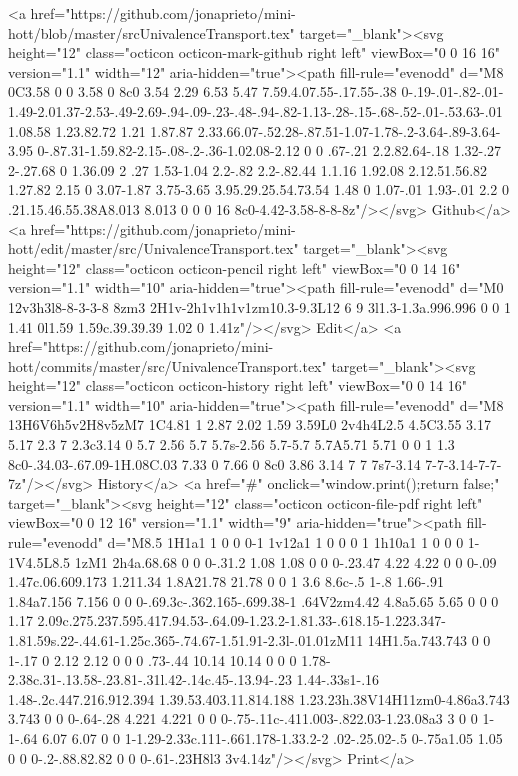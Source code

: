       <a href="https://github.com/jonaprieto/mini-hott/blob/master/srcUnivalenceTransport.tex" target="_blank"><svg height="12" class="octicon octicon-mark-github right left" viewBox="0 0 16 16" version="1.1" width="12" aria-hidden="true"><path fill-rule="evenodd" d="M8 0C3.58 0 0 3.58 0 8c0 3.54 2.29 6.53 5.47 7.59.4.07.55-.17.55-.38 0-.19-.01-.82-.01-1.49-2.01.37-2.53-.49-2.69-.94-.09-.23-.48-.94-.82-1.13-.28-.15-.68-.52-.01-.53.63-.01 1.08.58 1.23.82.72 1.21 1.87.87 2.33.66.07-.52.28-.87.51-1.07-1.78-.2-3.64-.89-3.64-3.95 0-.87.31-1.59.82-2.15-.08-.2-.36-1.02.08-2.12 0 0 .67-.21 2.2.82.64-.18 1.32-.27 2-.27.68 0 1.36.09 2 .27 1.53-1.04 2.2-.82 2.2-.82.44 1.1.16 1.92.08 2.12.51.56.82 1.27.82 2.15 0 3.07-1.87 3.75-3.65 3.95.29.25.54.73.54 1.48 0 1.07-.01 1.93-.01 2.2 0 .21.15.46.55.38A8.013 8.013 0 0 0 16 8c0-4.42-3.58-8-8-8z"/></svg> Github</a>
      <a href="https://github.com/jonaprieto/mini-hott/edit/master/src/UnivalenceTransport.tex" target="_blank"><svg height="12" class="octicon octicon-pencil right left" viewBox="0 0 14 16" version="1.1" width="10" aria-hidden="true"><path fill-rule="evenodd" d="M0 12v3h3l8-8-3-3-8 8zm3 2H1v-2h1v1h1v1zm10.3-9.3L12 6 9 3l1.3-1.3a.996.996 0 0 1 1.41 0l1.59 1.59c.39.39.39 1.02 0 1.41z"/></svg> Edit</a>
      <a href="https://github.com/jonaprieto/mini-hott/commits/master/src/UnivalenceTransport.tex" target="_blank"><svg height="12" class="octicon octicon-history right left" viewBox="0 0 14 16" version="1.1" width="10" aria-hidden="true"><path fill-rule="evenodd" d="M8 13H6V6h5v2H8v5zM7 1C4.81 1 2.87 2.02 1.59 3.59L0 2v4h4L2.5 4.5C3.55 3.17 5.17 2.3 7 2.3c3.14 0 5.7 2.56 5.7 5.7s-2.56 5.7-5.7 5.7A5.71 5.71 0 0 1 1.3 8c0-.34.03-.67.09-1H.08C.03 7.33 0 7.66 0 8c0 3.86 3.14 7 7 7s7-3.14 7-7-3.14-7-7-7z"/></svg> History</a>
      <a  href="#" onclick="window.print();return false;" target="_blank"><svg height="12" class="octicon octicon-file-pdf right left" viewBox="0 0 12 16" version="1.1" width="9" aria-hidden="true"><path fill-rule="evenodd" d="M8.5 1H1a1 1 0 0 0-1 1v12a1 1 0 0 0 1 1h10a1 1 0 0 0 1-1V4.5L8.5 1zM1 2h4a.68.68 0 0 0-.31.2 1.08 1.08 0 0 0-.23.47 4.22 4.22 0 0 0-.09 1.47c.06.609.173 1.211.34 1.8A21.78 21.78 0 0 1 3.6 8.6c-.5 1-.8 1.66-.91 1.84a7.156 7.156 0 0 0-.69.3c-.362.165-.699.38-1 .64V2zm4.42 4.8a5.65 5.65 0 0 0 1.17 2.09c.275.237.595.417.94.53-.64.09-1.23.2-1.81.33-.618.15-1.223.347-1.81.59s.22-.44.61-1.25c.365-.74.67-1.51.91-2.3l-.01.01zM11 14H1.5a.743.743 0 0 1-.17 0 2.12 2.12 0 0 0 .73-.44 10.14 10.14 0 0 0 1.78-2.38c.31-.13.58-.23.81-.31l.42-.14c.45-.13.94-.23 1.44-.33s1-.16 1.48-.2c.447.216.912.394 1.39.53.403.11.814.188 1.23.23h.38V14H11zm0-4.86a3.743 3.743 0 0 0-.64-.28 4.221 4.221 0 0 0-.75-.11c-.411.003-.822.03-1.23.08a3 3 0 0 1-1-.64 6.07 6.07 0 0 1-1.29-2.33c.111-.661.178-1.33.2-2 .02-.25.02-.5 0-.75a1.05 1.05 0 0 0-.2-.88.82.82 0 0 0-.61-.23H8l3 3v4.14z"/></svg> Print</a>
